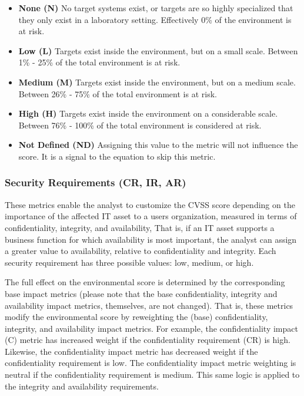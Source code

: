     \begin{itemize}
      \item
        \textbf{None (N)} No target systems exist, or targets are so highly
        specialized that they only exist in a laboratory setting. Effectively
        0\% of the environment is at risk.
      \item
        \textbf{Low (L)} Targets exist inside the environment, but on a small
        scale. Between 1\% - 25\% of the total environment is at risk.
      \item
        \textbf{Medium (M)} Targets exist inside the environment, but on a
        medium scale. Between 26\% - 75\% of the total environment is at risk.
      \item
        \textbf{High (H)} Targets exist inside the environment on a
        considerable scale. Between 76\% - 100\% of the total environment is
        considered at risk.
      \item
        \textbf{Not Defined (ND)} Assigning this value to the metric will not
        influence the score. It is a signal to the equation to skip this
        metric.
    \end{itemize}

    \subsubsection{Security Requirements (CR, IR, AR)}\label{subsec:security-requirements-cr-ir-ar}

    These metrics enable the analyst to customize the CVSS score depending
    on the importance of the affected IT asset to a users organization,
    measured in terms of confidentiality, integrity, and availability, That
    is, if an IT asset supports a business function for which availability
    is most important, the analyst can assign a greater value to
    availability, relative to confidentiality and integrity. Each security
    requirement has three possible values: low, medium, or high.

    The full effect on the environmental score is determined by the
    corresponding base impact metrics (please note that the base
    confidentiality, integrity and availability impact metrics, themselves,
    are not changed). That is, these metrics modify the environmental score
    by reweighting the (base) confidentiality, integrity, and availability
    impact metrics. For example, the confidentiality impact (C) metric has
    increased weight if the confidentiality requirement (CR) is high.
    Likewise, the confidentiality impact metric has decreased weight if the
    confidentiality requirement is low. The confidentiality impact metric
    weighting is neutral if the confidentiality requirement is medium. This
    same logic is applied to the integrity and availability requirements.


